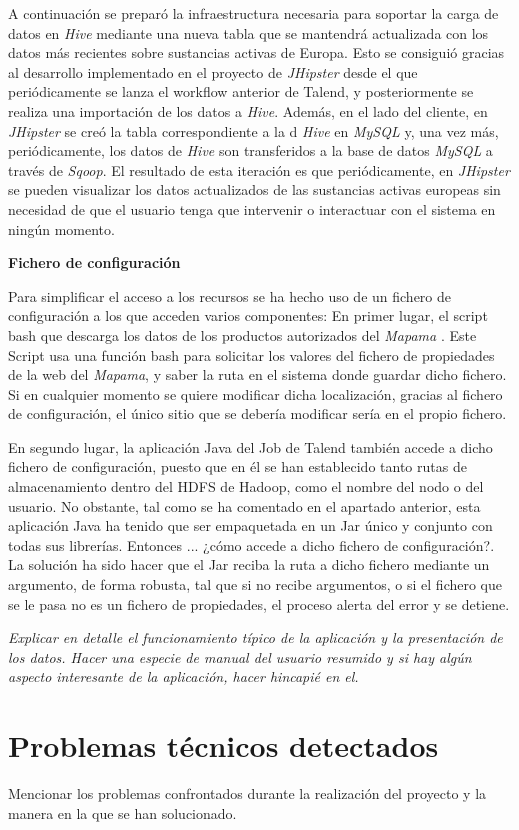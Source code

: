 \par
A continuación se preparó la infraestructura necesaria para soportar la carga de datos en \textit{Hive} mediante una nueva tabla que se mantendrá actualizada con los datos más recientes sobre sustancias activas de Europa. Esto se consiguió gracias al desarrollo implementado en el proyecto de \textit{JHipster} desde el que periódicamente se lanza el workflow anterior de Talend, y posteriormente se realiza una importación de los datos a \textit{Hive}. Además, en el lado del cliente, en \textit{JHipster} se creó la tabla correspondiente a la d \textit{Hive} en \textit{MySQL} y, una vez más, periódicamente, los datos de \textit{Hive} son transferidos a la base de datos \textit{MySQL} a través de \textit{Sqoop}. El resultado de esta iteración es que periódicamente, en \textit{JHipster} se pueden visualizar los datos actualizados de las sustancias activas europeas sin necesidad de que el usuario tenga que intervenir o interactuar con el sistema en ningún momento. 


\bigskip
\par 
\textbf{Fichero de configuración}
\par
Para simplificar el acceso a los recursos se ha hecho uso de un fichero de configuración a los que acceden varios componentes: En primer lugar, el script bash que descarga los datos de los productos autorizados del \textit{Mapama} \cite{mapama}. Este Script usa una función bash para solicitar los valores del fichero de propiedades de la web del \textit{Mapama}, y saber la ruta en el sistema donde guardar dicho fichero. Si en cualquier momento se quiere modificar dicha localización, gracias al fichero de configuración, el único sitio que se debería modificar sería en el propio fichero. 
\par En segundo lugar, la aplicación Java del Job de Talend también accede a dicho fichero de configuración, puesto que en él se han establecido tanto rutas de almacenamiento dentro del HDFS de Hadoop, como el nombre del nodo o del usuario. No obstante, tal como se ha comentado en el apartado anterior, esta aplicación Java ha tenido que ser empaquetada en un Jar único y conjunto con todas sus librerías. Entonces ... ¿cómo accede a dicho fichero de configuración?. La solución ha sido hacer que el Jar reciba la ruta a dicho fichero mediante un argumento, de forma robusta, tal que si no recibe argumentos, o si el fichero que se le pasa no es un fichero de propiedades, el proceso alerta del error y se detiene. 
\bigskip
\par
\textit{Explicar en detalle el funcionamiento típico de la aplicación y la presentación de los datos. Hacer una especie de manual del usuario resumido y si hay algún aspecto interesante de la aplicación, hacer hincapié en el.}
\section{Problemas técnicos detectados}
Mencionar los problemas confrontados durante la realización del proyecto y la manera en la que se han solucionado.
